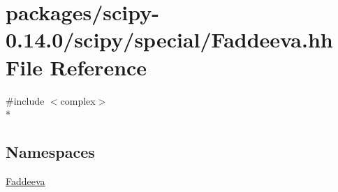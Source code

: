 \hypertarget{Faddeeva_8hh}{}\section{packages/scipy-\/0.14.0/scipy/special/\+Faddeeva.hh File Reference}
\label{Faddeeva_8hh}
{\ttfamily \#include $<$complex$>$}\\*
\subsection*{Namespaces}
\begin{DoxyCompactItemize}
\item 
 \hyperlink{namespaceFaddeeva}{Faddeeva}
\end{DoxyCompactItemize}
